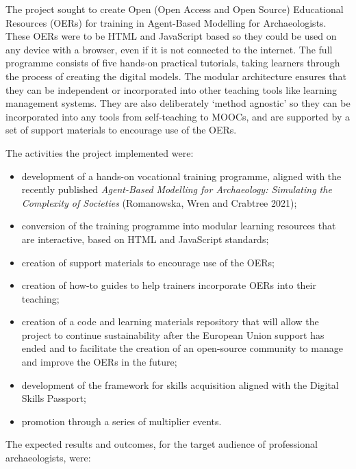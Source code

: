 \documentclass[
]{article}
\begin{document}
The project sought to create Open (Open Access and Open Source) Educational Resources (OERs) for training in Agent-Based Modelling for Archaeologists. These OERs were to be HTML and JavaScript based so they could be used on any device with a browser, even if it is not connected to the internet. The full programme consists of five hands-on practical tutorials, taking learners through the process of creating the digital models. The modular architecture ensures that they can be independent or incorporated into other teaching tools like learning management systems. They are also deliberately `method agnostic' so they can be incorporated into any tools from self-teaching to MOOCs, and are supported by a set of support materials to encourage use of the OERs.

The activities the project implemented were:

\begin{itemize}
\item
  development of a hands-on vocational training programme, aligned with the recently published \emph{Agent-Based Modelling for Archaeology: Simulating the Complexity of Societies} (Romanowska, Wren and Crabtree 2021);
\item
  conversion of the training programme into modular learning resources that are interactive, based on HTML and JavaScript standards;
\item
  creation of support materials to encourage use of the OERs;
\item
  creation of how-to guides to help trainers incorporate OERs into their teaching;
\item
  creation of a code and learning materials repository that will allow the project to continue sustainability after the European Union support has ended and to facilitate the creation of an open-source community to manage and improve the OERs in the future;
\item
  development of the framework for skills acquisition aligned with the Digital Skills Passport;
\item
  promotion through a series of multiplier events.
\end{itemize}

The expected results and outcomes, for the target audience of professional archaeologists, were:
\end{document}
